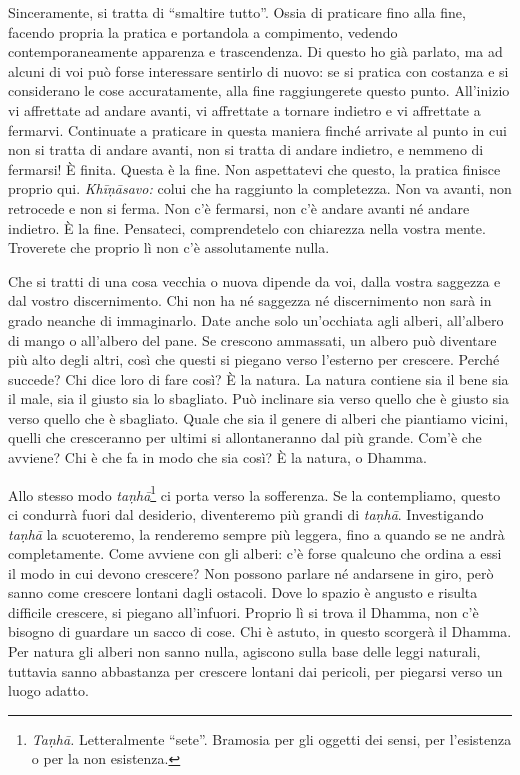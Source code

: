 Sinceramente, si tratta di ``smaltire tutto''. Ossia di praticare fino
alla fine, facendo propria la pratica e portandola a compimento, vedendo
contemporaneamente apparenza e trascendenza. Di questo ho già parlato,
ma ad alcuni di voi può forse interessare sentirlo di nuovo: se si
pratica con costanza e si considerano le cose accuratamente, alla fine
raggiungerete questo punto. All'inizio vi affrettate ad andare avanti,
vi affrettate a tornare indietro e vi affrettate a fermarvi. Continuate
a praticare in questa maniera finché arrivate al punto in cui non si
tratta di andare avanti, non si tratta di andare indietro, e nemmeno di
fermarsi! È finita. Questa è la fine. Non aspettatevi che questo, la
pratica finisce proprio qui. \emph{Khīṇāsavo:} colui che ha raggiunto la
completezza. Non va avanti, non retrocede e non si ferma. Non c'è
fermarsi, non c'è andare avanti né andare indietro. È la fine.
Pensateci, comprendetelo con chiarezza nella vostra mente. Troverete che
proprio lì non c'è assolutamente nulla.

Che si tratti di una cosa vecchia o nuova dipende da voi, dalla vostra
saggezza e dal vostro discernimento. Chi non ha né saggezza né
discernimento non sarà in grado neanche di immaginarlo. Date anche solo
un'occhiata agli alberi, all'albero di mango o all'albero del pane. Se
crescono ammassati, un albero può diventare più alto degli altri, così
che questi si piegano verso l'esterno per crescere. Perché succede? Chi
dice loro di fare così? È la natura. La natura contiene sia il bene sia
il male, sia il giusto sia lo sbagliato. Può inclinare sia verso quello
che è giusto sia verso quello che è sbagliato. Quale che sia il genere
di alberi che piantiamo vicini, quelli che cresceranno per ultimi si
allontaneranno dal più grande. Com'è che avviene? Chi è che fa in modo
che sia così? È la natura, o Dhamma.

Allo stesso modo \emph{taṇhā}\footnote{\emph{Taṇhā.} Letteralmente
  ``sete''. Bramosia per gli oggetti dei sensi, per l'esistenza o per la
  non esistenza.} ci porta verso la sofferenza. Se la contempliamo,
questo ci condurrà fuori dal desiderio, diventeremo più grandi di
\emph{taṇhā}. Investigando \emph{taṇhā} la scuoteremo, la renderemo
sempre più leggera, fino a quando se ne andrà completamente. Come
avviene con gli alberi: c'è forse qualcuno che ordina a essi il modo in
cui devono crescere? Non possono parlare né andarsene in giro, però
sanno come crescere lontani dagli ostacoli. Dove lo spazio è angusto e
risulta difficile crescere, si piegano all'infuori. Proprio lì si trova
il Dhamma, non c'è bisogno di guardare un sacco di cose. Chi è astuto,
in questo scorgerà il Dhamma. Per natura gli alberi non sanno nulla,
agiscono sulla base delle leggi naturali, tuttavia sanno abbastanza per
crescere lontani dai pericoli, per piegarsi verso un luogo adatto.

